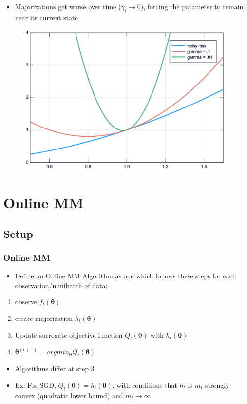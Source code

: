 \documentclass{beamer}
\newcommand{\iter}[2]{#1^{(#2)}}
\begin{document}
\begin{frame}
  \begin{itemize}
    \item Majorizations get worse over time ($\gamma_t \rightarrow 0$), forcing the parameter to remain near its current state
  \end{itemize}
  \begin{figure}
    \includegraphics[width=.7\textwidth]{figures/quadraticupperbound.png}
  \end{figure}
\end{frame}



\section{Online MM}
\subsection{Setup}
\begin{frame}
  \frametitle{Online MM}
  \begin{itemize}
    \item Define an Online MM Algorithm as one which follows these steps for each observation/minibatch of data:
  \end{itemize}
  \begin{enumerate}
    \item observe $f_t(\bm\theta)$
    \item create majorization $h_t(\bm\theta)$
    \item Update surrogate objective function $Q_t(\bm\theta)$ with $h_t(\bm\theta)$
    \item $\iter{\bm\theta}{t+1} = argmin_{\bm\theta}Q_t(\bm\theta)$
  \end{enumerate}
\end{frame}
\begin{frame}
  \begin{itemize}
    \item Algorithms differ at step 3
    \item Ex: For SGD, $Q_t(\bm\theta) = h_t(\bm\theta)$, with conditions that $h_t$ is $m_t$-strongly convex (quadratic lower bound) and $m_t\rightarrow\infty$
  \end{itemize}
\end{frame}
\end{document}
